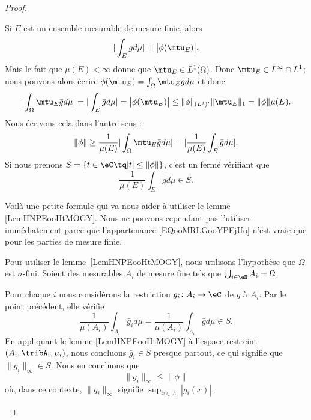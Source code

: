 \begin{proof}
\begin{subproof}
		\spitem[Si \( p=1\), une formule]
		Si \( E\) est un ensemble mesurable de mesure finie, alors
		\begin{equation}
			| \int_Egd\mu |=\big| \phi(\mtu_E) \big|.
		\end{equation}
		Mais le fait que \( \mu(E)<\infty\) donne que \( \mtu_E\in L^1(\Omega)\). Donc \( \mtu_E\in L^{\infty}\cap L^1\); nous pouvons alors écrire \( \phi(\mtu_E)=\int_{\Omega}\mtu_E\bar gd\mu\) et donc
		\begin{equation}    \label{EqUPCTooJvoKKI}
			| \int_{\Omega}\mtu_E\bar gd\mu |=|\int_E\bar gd\mu |=\big| \phi(\mtu_E) \big|\leq \| \phi \|_{(L^1)'}\| \mtu_E \|_1=\| \phi \|\mu(E).
		\end{equation}
		Nous écrivons cela dans l'autre sens :
		\begin{equation}
			\| \phi \|\geq \frac{1}{ \mu(E) }| \int_{\Omega}\mtu_E\bar gd\mu |=| \frac{1}{ \mu(E) }\int_E\bar gd\mu |.
		\end{equation}
		Si nous prenons \( S=\{ t\in \eC\tq | t |\leq \| \phi \| \}\), c'est un fermé vérifiant que
		\begin{equation}        \label{EQooMRLGooYPEjUo}
			\frac{1}{ \mu(E) }\int_E\bar gd\mu\in S.
		\end{equation}

		Voilà une petite formule qui va nous aider à utiliser le lemme \ref{LemHNPEooHtMOGY}. Nous ne pouvons cependant pas l'utiliser immédiatement parce que l'appartenance \eqref{EQooMRLGooYPEjUo} n'est vraie que pour les parties de mesure finie.

		\spitem[Si \( p=1\), conclusion\cite{MonCerveau}]

		Pour utiliser le lemme~\ref{LemHNPEooHtMOGY}, nous utilisons l'hypothèse que \( \Omega\) est \( \sigma\)-fini. Soient des mesurables \( A_i\) de mesure fine tels que \( \bigcup_{i\in \eN}A_i=\Omega\).

		Pour chaque \( i\) nous considérons la restriction \( g_i\colon A_i\to \eC\) de \( g\) à \( A_i\). Par le point précédent, elle vérifie
		\begin{equation}
			\frac{1}{ \mu(A_i) }\int_{A_i}\bar g_id\mu=\frac{1}{ \mu(A_i) }\int_{A_i}\bar gd\mu\in S.
		\end{equation}
		En appliquant le lemme \ref{LemHNPEooHtMOGY} à l'espace restreint \( (A_i,\tribA_i,\mu_i)\), nous concluons \( \bar g_i\in S\) presque partout, ce qui signifie que \( \| g_i \|_{\infty}\in S\). Nous en concluons que
		\begin{equation}
			\| g_i \|_{\infty}\leq \| \phi \|
		\end{equation}
		où, dans ce contexte, \( \| g_i \|_{\infty}\) signifie \( \sup_{x\in A_i}| g_i(x) |\).


\end{subproof}
\end{proof}
